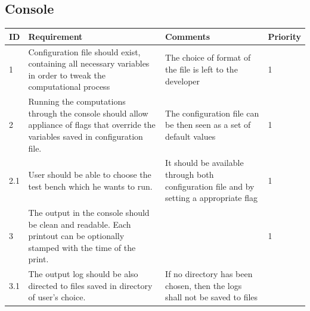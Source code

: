 \documentclass{article}
\begin{document}
\subsection{Console} \label{console_func_req}

\begin{center}
\hspace*{-2.1cm}
	\begin{longtable}{| l | p{4cm} | p{3.5cm} | l |}
	
		\hline
	  	ID & Requirement & Comments & Priority \\
		\hline
		
		1 & 
		
		Configuration file should exist, containing all necessary variables in order to tweak the computational process & 
		
		The choice of format of the file is left to the developer &
		 
		1 
		
		\\ \hline
				
		2 & 
		
		Running the computations through the console should allow appliance of flags that override the variables saved in configuration file. & 
		
		The configuration file can be then seen as a set of default values &
		 
		1 
		\\ \hline
		
		2.1 & 
		
		User should be able to choose the test bench which he wants to run.& 
		
		It should be available through both configuration file and by setting a appropriate flag &
		 
		1 
		\\ \hline
		

		3 & 
		
		The output in the console should be clean and readable.
		Each printout can be optionally stamped with the time of the print.& 
		
		&
		 
		1
		\\ \hline
		
		
		3.1 & 
		
		The output log should be also directed to files saved in directory of user's choice.& 
		
		If no directory has been chosen, then the logs shall not be saved to files&
		 

\end{longtable}
\end{center}
\end{document}
